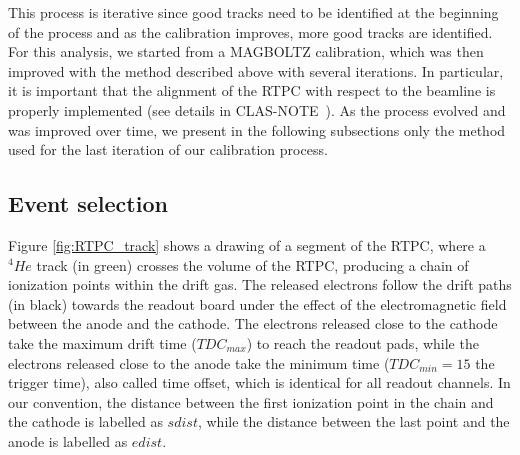 This process is iterative since good tracks need to be identified at the 
beginning of the process and as the calibration improves, more good tracks 
are identified. For this analysis, we started from a MAGBOLTZ 
calibration, which was then improved with the method described above with 
several iterations. In particular, it is important that the alignment of the 
RTPC with respect to the beamline is properly implemented (see details in
CLAS-NOTE~\cite{eg6beamoffset}). As the process evolved and was improved over 
time, we present in the following subsections only the method used for the last 
iteration of our calibration process.

\subsection{Event selection}
Figure \ref{fig:RTPC_track} shows a drawing of a segment of the RTPC, 
where a $^4He$ track (in 
green) crosses the volume of the RTPC, producing a chain of ionization points 
within the drift gas. The released electrons follow the drift paths (in black) 
towards the readout board under the effect of the electromagnetic field 
between the anode and the cathode. The electrons released close to the cathode 
take the maximum drift time ($TDC_{max}$) to reach the readout pads, while the 
electrons released close to the anode take the minimum time ($TDC_{min} = 15$ the 
trigger time), also called time offset, which is identical 
for all readout channels. In our convention, the distance between the 
first ionization point in the chain and the cathode is labelled as $sdist$, 
while the distance between the last point and the anode is labelled as 
$edist$. 

